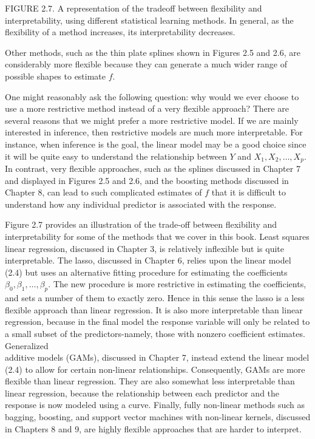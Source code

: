 \documentclass[10pt]{article}
\begin{document}
FIGURE 2.7. A representation of the tradeoff between flexibility and interpretability, using different statistical learning methods. In general, as the flexibility of a method increases, its interpretability decreases.

Other methods, such as the thin plate splines shown in Figures 2.5 and 2.6, are considerably more flexible because they can generate a much wider range of possible shapes to estimate $f$.

One might reasonably ask the following question: why would we ever choose to use a more restrictive method instead of a very flexible approach? There are several reasons that we might prefer a more restrictive model. If we are mainly interested in inference, then restrictive models are much more interpretable. For instance, when inference is the goal, the linear model may be a good choice since it will be quite easy to understand the relationship between $Y$ and $X_{1}, X_{2}, \ldots, X_{p}$. In contrast, very flexible approaches, such as the splines discussed in Chapter 7 and displayed in Figures 2.5 and 2.6, and the boosting methods discussed in Chapter 8, can lead to such complicated estimates of $f$ that it is difficult to understand how any individual predictor is associated with the response.

Figure 2.7 provides an illustration of the trade-off between flexibility and interpretability for some of the methods that we cover in this book. Least squares linear regression, discussed in Chapter 3, is relatively inflexible but is quite interpretable. The lasso, discussed in Chapter 6, relies upon the linear model (2.4) but uses an alternative fitting procedure for estimating the coefficients $\beta_{0}, \beta_{1}, \ldots, \beta_{p}$. The new procedure is more restrictive in estimating the coefficients, and sets a number of them to exactly zero. Hence in this sense the lasso is a less flexible approach than linear regression. It is also more interpretable than linear regression, because in the final model the response variable will only be related to a small subset of the predictors-namely, those with nonzero coefficient estimates. Generalized\\
additive models (GAMs), discussed in Chapter 7, instead extend the linear model (2.4) to allow for certain non-linear relationships. Consequently, GAMs are more flexible than linear regression. They are also somewhat less interpretable than linear regression, because the relationship between each predictor and the response is now modeled using a curve. Finally, fully non-linear methods such as bagging, boosting, and support vector machines with non-linear kernels, discussed in Chapters 8 and 9, are highly flexible approaches that are harder to interpret.
\end{document}
